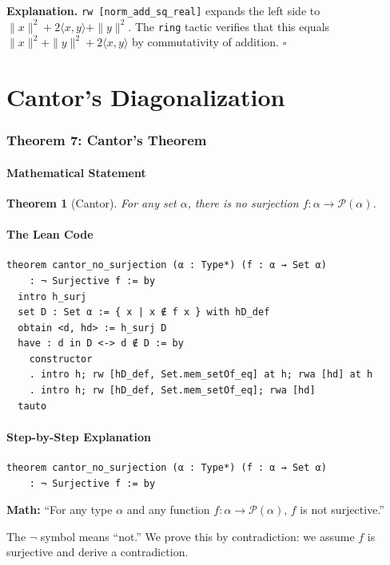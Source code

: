 \documentclass[11pt]{article}
\theoremstyle{plain}
\newtheorem{theorem}{Theorem}[section]
\theoremstyle{definition}
\begin{document}
\textbf{Explanation.} \texttt{rw [norm\_add\_sq\_real]} expands the left side to
$\|x\|^2 + 2\langle x,y\rangle + \|y\|^2$. The \texttt{ring} tactic verifies
that this equals $\|x\|^2 + \|y\|^2 + 2\langle x,y\rangle$ by commutativity of
addition. $\square$

\part{Cantor's Diagonalization}

\section{Theorem 7: Cantor's Theorem}

\subsection{Mathematical Statement}

\begin{theorem}[Cantor]
For any set $\alpha$, there is no surjection $f\colon \alpha \to \mathcal{P}(\alpha)$.
\end{theorem}

\subsection{The Lean Code}

\begin{lstlisting}
theorem cantor_no_surjection (α : Type*) (f : α → Set α)
    : ¬ Surjective f := by
  intro h_surj
  set D : Set α := { x | x ∉ f x } with hD_def
  obtain <d, hd> := h_surj D
  have : d in D <-> d ∉ D := by
    constructor
    . intro h; rw [hD_def, Set.mem_setOf_eq] at h; rwa [hd] at h
    . intro h; rw [hD_def, Set.mem_setOf_eq]; rwa [hd]
  tauto
\end{lstlisting}

\subsection{Step-by-Step Explanation}

\begin{tcolorbox}[title=Line 1--2: Declaration]
\begin{lstlisting}
theorem cantor_no_surjection (α : Type*) (f : α → Set α)
    : ¬ Surjective f := by
\end{lstlisting}
\textbf{Math:} ``For any type $\alpha$ and any function $f\colon\alpha\to\mathcal{P}(\alpha)$,
$f$ is not surjective.''

The $\neg$ symbol means ``not.'' We prove this by contradiction: we assume $f$
is surjective and derive a contradiction.
\end{tcolorbox}
\end{document}
